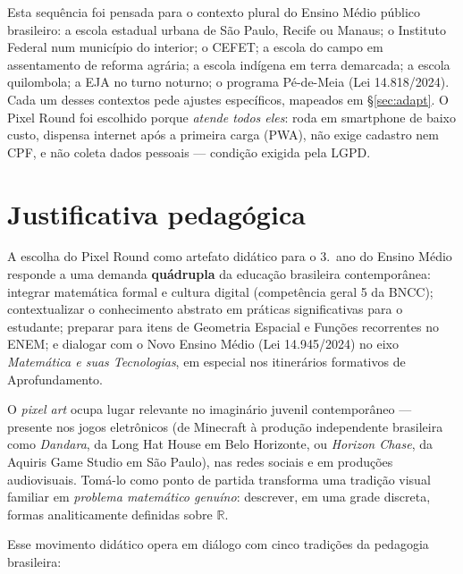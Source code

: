 \documentclass[12pt,a4paper]{scrartcl}
\newcommand{\acc}[1]{\textcolor{accent}{\textbf{#1}}}
\begin{document}
\begin{nota}
Esta sequência foi pensada para o contexto plural do Ensino Médio público brasileiro: a escola estadual urbana de São Paulo, Recife ou Manaus; o Instituto Federal num município do interior; o CEFET; a escola do campo em assentamento de reforma agrária; a escola indígena em terra demarcada; a escola quilombola; a EJA no turno noturno; o programa Pé-de-Meia (Lei 14.818/2024). Cada um desses contextos pede ajustes específicos, mapeados em §\ref{sec:adapt}. O Pixel Round foi escolhido porque \emph{atende todos eles}: roda em smartphone de baixo custo, dispensa internet após a primeira carga (PWA), não exige cadastro nem CPF, e não coleta dados pessoais --- condição exigida pela LGPD.
\end{nota}

\section{Justificativa pedagógica}\label{sec:justificativa}

A escolha do Pixel Round como artefato didático para o 3.\textordmasculine\ ano do Ensino Médio responde a uma demanda \acc{quádrupla} da educação brasileira contemporânea: integrar matemática formal e cultura digital (competência geral 5 da BNCC); contextualizar o conhecimento abstrato em práticas significativas para o estudante; preparar para itens de Geometria Espacial e Funções recorrentes no ENEM; e dialogar com o Novo Ensino Médio (Lei 14.945/2024) no eixo \emph{Matemática e suas Tecnologias}, em especial nos itinerários formativos de Aprofundamento.

O \emph{pixel art} ocupa lugar relevante no imaginário juvenil contemporâneo --- presente nos jogos eletrônicos (de Minecraft à produção independente brasileira como \emph{Dandara}, da Long Hat House em Belo Horizonte, ou \emph{Horizon Chase}, da Aquiris Game Studio em São Paulo), nas redes sociais e em produções audiovisuais. Tomá-lo como ponto de partida transforma uma tradição visual familiar em \emph{problema matemático genuíno}: descrever, em uma grade discreta, formas analiticamente definidas sobre $\mathbb{R}$.

Esse movimento didático opera em diálogo com cinco tradições da pedagogia brasileira:
\end{document}
